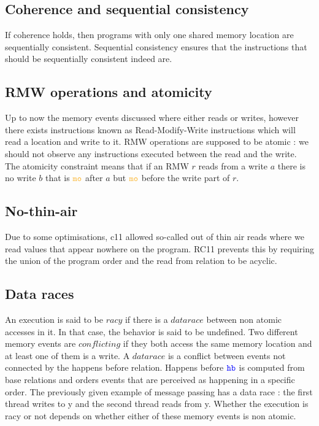 \documentclass[a4,11pt,dvipsnames]{article}
\begin{document}
\subsection{Coherence and sequential consistency}

If coherence holds, then programs with only one shared memory location are sequentially consistent. Sequential consistency ensures that the instructions that should be sequentially consistent indeed are.

\subsection{RMW operations and atomicity}

Up to now the memory events discussed where either reads or writes, however there exists instructions known as Read-Modify-Write instructions which will read a location and write to it. RMW operations are supposed to be atomic : we should not observe any instructions executed between the read and the write. The atomicity constraint means that if an RMW $r$ reads from a write $a$ there is no write $b$ that is $\mo$ after $a$ but $\mo$ before the write part of $r$.

\subsection{No-thin-air}

Due to some optimisations, c11 allowed so-called out of thin air reads where we read values that appear nowhere on the program. RC11 prevents this by requiring the union of the program order and the read from relation to be acyclic.


\subsection{Data races}

An execution is said to be $racy$ if there is a $data race$ between non atomic accesses in it. In that case, the behavior is said to be undefined. Two different memory events are $conflicting$ if they both access the same memory location and at least one of them is a write. A $data race$ is a conflict between events not connected by the happens before relation. Happens before $\texttt{\color{blue}hb}$ is computed from base relations and orders events that are perceived as happening in a specific order.
The previously given example of message passing has a data race : the first thread writes to y and the second thread reads from y. Whether the execution is racy or not depends on whether either of these memory events is non atomic.
\end{document}

